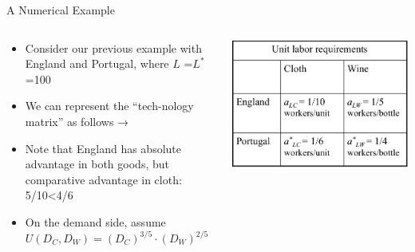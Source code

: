 \documentclass[10pt,hyperref={CJKbookmarks=true},xcolor=dvipsnames,aspectratio=169]{beamer}
\begin{document}
\begin{frame}{A Numerical Example }


\begin{columns}[onlytextwidth]
\begin{column}{0.5\textwidth}
\begin{itemize}
\item Consider our previous example with England and Portugal, where $L$
=$L^{*}$ =100 
\item We can represent the “tech-nology matrix” as follows → 
\item Note that England has absolute advantage in both goods, but comparative
advantage in cloth: 5/10<4/6 
\item On the demand side, assume$U(D_{C},D_{W})=(D_{C})^{3/5}\cdot(D_{W})^{2/5}$
\end{itemize}

\end{column}
\begin{column}{0.5\textwidth}
\includegraphics[width=\columnwidth]{fig/ricardo/lec3-09}
\end{column}
\end{columns}


\end{frame}
\end{document}
